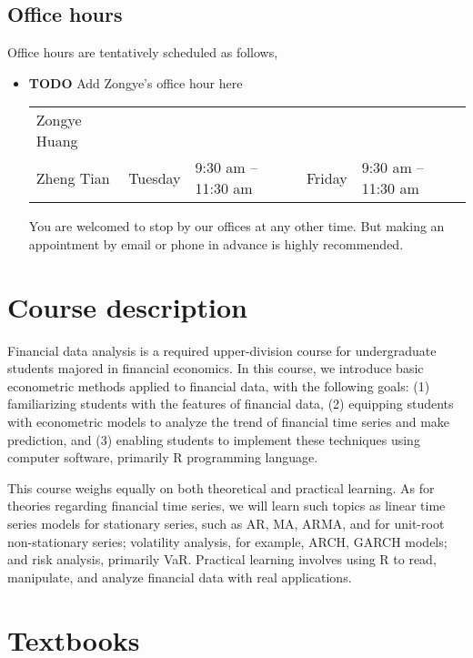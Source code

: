 \documentclass[a4paper,11pt]{article}
\begin{document}
\subsection*{Office hours}
\label{sec:org943ad35}
Office hours are tentatively scheduled as follows,

\begin{itemize}
\item {\bfseries\sffamily TODO} Add Zongye's office hour here
\label{sec:org0a55756}
\begin{center}
\begin{tabular}{lllll}
Zongye Huang &  &  &  & \\
Zheng Tian & Tuesday & 9:30 am -- 11:30 am & Friday & 9:30 am -- 11:30 am\\
\end{tabular}
\end{center}

You are welcomed to stop by our offices at any other time. But making
an appointment by email or phone in advance is highly recommended.
\end{itemize}


\section{Course description}
\label{sec:org1026f67}

Financial data analysis is a required upper-division course for
undergraduate students majored in financial economics. In this course,
we introduce basic econometric methods applied to financial data, with
the following goals: (1) familiarizing students with the features of
financial data, (2) equipping students with econometric models to
analyze the trend of financial time series and make prediction, and
(3) enabling students to implement these techniques using computer
software, primarily R programming language.

This course weighs equally on both theoretical and practical
learning. As for theories regarding financial time series, we will
learn such topics as linear time series models for stationary series,
such as AR, MA, ARMA, and for unit-root non-stationary series;
volatility analysis, for example, ARCH, GARCH models; and risk
analysis, primarily VaR. Practical learning involves using R to read,
manipulate, and analyze financial data with real applications.


\section{Textbooks}
\label{sec:orgc6047b1}
\end{document}
